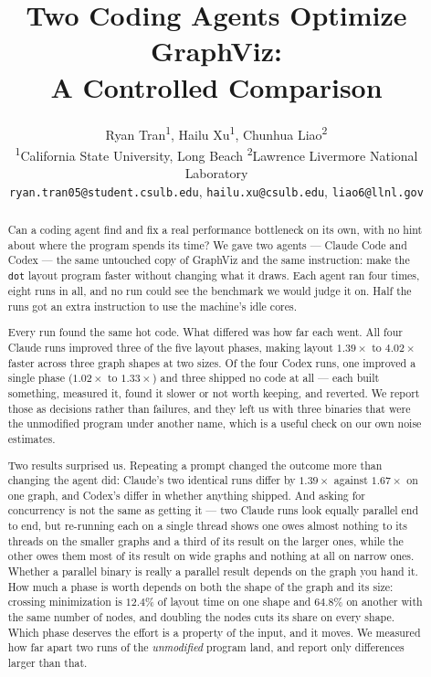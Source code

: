 \documentclass{article}
\title{Two Coding Agents Optimize GraphViz:\\A Controlled Comparison}
\author{
  Ryan Tran\textsuperscript{1},
  Hailu Xu\textsuperscript{1},
  Chunhua Liao\textsuperscript{2} \\
  \textsuperscript{1}California State University, Long Beach \quad
  \textsuperscript{2}Lawrence Livermore National Laboratory \\
  \texttt{ryan.tran05@student.csulb.edu}, \texttt{hailu.xu@csulb.edu},
  \texttt{liao6@llnl.gov}
}
\begin{document}
\maketitle

\begin{abstract}
Can a coding agent find and fix a real performance bottleneck on its own, with
no hint about where the program spends its time? We gave two agents --- Claude
Code and Codex --- the same untouched copy of GraphViz and the same instruction:
make the \texttt{dot} layout program faster without changing what it draws. Each
agent ran four times, eight runs in all, and no run could see the benchmark we
would judge it on. Half the runs got an extra instruction to use the machine's
idle cores.

Every run found the same hot code. What differed was how far each went. All four
Claude runs improved three of the five layout phases, making layout $1.39\times$
to $4.02\times$ faster across three graph shapes at two sizes. Of the four Codex
runs, one improved a single phase ($1.02\times$ to $1.33\times$) and three
shipped no code at all --- each built something, measured it, found it slower or
not worth keeping, and reverted. We report those as decisions rather than
failures, and they left us with three binaries that were the unmodified program
under another name, which is a useful check on our own noise estimates.

Two results surprised us. Repeating a prompt changed the outcome more than
changing the agent did: Claude's two identical runs differ by $1.39\times$
against $1.67\times$ on one graph, and Codex's differ in whether anything
shipped. And asking for concurrency is not the same as getting it --- two Claude
runs look equally parallel end to end, but re-running each on a single thread
shows one owes almost nothing to its threads on the smaller graphs and a third
of its result on the larger ones, while the other owes them most of its result
on wide graphs and nothing at all on narrow ones. Whether a parallel binary is
really a parallel result depends on the graph you hand it. How much
a phase is worth depends on both the shape of the graph and its size: crossing
minimization is $12.4\%$ of layout time on one shape and $64.8\%$ on another
with the same number of nodes, and doubling the nodes cuts its share on every
shape. Which phase deserves the effort is a property of the input, and it moves.
We measured how far apart two runs of the \emph{unmodified} program land, and
report only differences larger than that.
\end{abstract}












\end{document}
